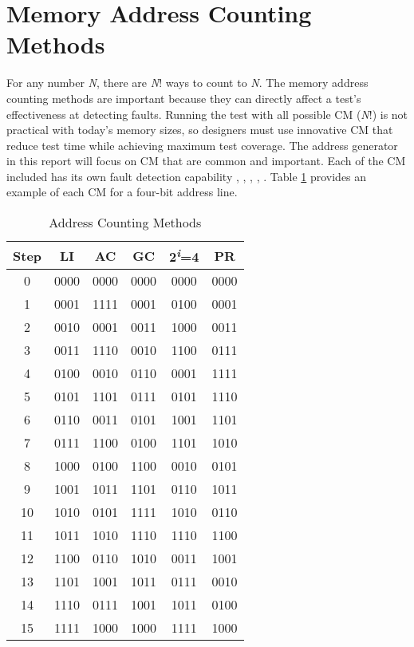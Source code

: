 \section{Memory Address Counting Methods}
\label{sect:bg-counting}
For any number \textit{N}, there are \textit{N}! ways to count to \textit{N}.  The memory address counting methods are important because they can directly affect a test's effectiveness at detecting faults.  Running the test with all possible CM (\textit{N}!) is not practical with today's memory sizes, so designers must use innovative CM that reduce test time while achieving maximum test coverage.  The address generator in this report will focus on CM that are common and important.  Each of the CM included has its own fault detection capability \cite{1347645}, \cite{990255}, \cite{1584048}, \cite{5359299}, \cite{1576336}.  Table \ref{tab:cm} provides an example of each CM for a four-bit address line.

\begin{table}[H]
  \caption{Address Counting Methods}
  \centering
  \begin{tabular}{|c|c|c|c|c|c|}
  \hline
  Step & LI & AC   & GC & 2\textsuperscript{\textit{i}}=4 & PR \\
  \hline\hline
   0 & 0000 & 0000 & 0000 & 0000 & 0000 \\ 
   1 & 0001 & 1111 & 0001 & 0100 & 0001 \\ 
   2 & 0010 & 0001 & 0011 & 1000 & 0011 \\ 
   3 & 0011 & 1110 & 0010 & 1100 & 0111 \\ 
   \hline
   4 & 0100 & 0010 & 0110 & 0001 & 1111 \\ 
   5 & 0101 & 1101 & 0111 & 0101 & 1110 \\ 
   6 & 0110 & 0011 & 0101 & 1001 & 1101 \\ 
   7 & 0111 & 1100 & 0100 & 1101 & 1010 \\ 
   \hline
   8 & 1000 & 0100 & 1100 & 0010 & 0101 \\ 
   9 & 1001 & 1011 & 1101 & 0110 & 1011 \\ 
  10 & 1010 & 0101 & 1111 & 1010 & 0110 \\ 
  11 & 1011 & 1010 & 1110 & 1110 & 1100 \\ 
   \hline
  12 & 1100 & 0110 & 1010 & 0011 & 1001 \\ 
  13 & 1101 & 1001 & 1011 & 0111 & 0010 \\ 
  14 & 1110 & 0111 & 1001 & 1011 & 0100 \\ 
  15 & 1111 & 1000 & 1000 & 1111 & 1000 \\ 
   \hline
   \end{tabular}
   \label{tab:cm}
\end{table}

